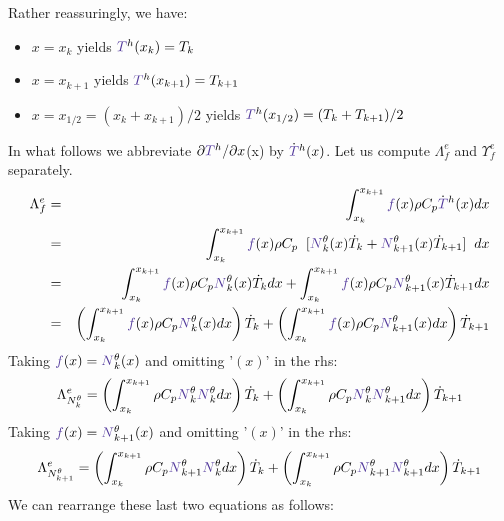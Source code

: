 Rather reassuringly, we have:
\begin{itemize}
\item $x=x_k$ yields ${\color{Violet}T}^h(x_k)=T_k$
\item $x=x_{k+1}$ yields ${\color{Violet}T}^h(x_{k+1})=T_{k+1}$
\item $x=x_{1/2}=(x_k+x_{k+1})/2$ yields ${\color{Violet}T}^h(x_{1/2})=(T_k+T_{k+1})/2$
\end{itemize}
In what follows we abbreviate $\partial {\color{Violet}T}^h/\partial x$(x) by $\dot{\color{Violet}T}^h(x)$.
Let us compute ${\Lambda}_f^e$ and ${\Upsilon}_f^e$ separately.
\begin{eqnarray}
{\Lambda}_f^e 
&=&\int_{x_k}^{x_{k+1}} {\color{Violet}f}(x) \rho C_p \dot {\color{Violet}T}^h(x) dx \nn\\
&=& \int_{x_k}^{x_{k+1}} {\color{Violet}f}(x) \rho C_p \;\;  [ {\color{Violet}N}_{k}^\theta(x) \dot{T}_k 
+ {\color{Violet}N}_{k+1}^\theta(x) \dot{T}_{k+1} ] \;\; dx  \nn\\
&=& \int_{x_k}^{x_{k+1}} {\color{Violet}f}(x) \rho C_p {\color{Violet}N}_{k}^\theta(x) \dot{T}_k  dx  
+ \int_{x_k}^{x_{k+1}} {\color{Violet}f}(x) \rho C_p {\color{Violet}N}_{k+1}^\theta(x) \dot{T}_{k+1}   dx \nn\\
&=&  \left( \int_{x_k}^{x_{k+1}} {\color{Violet}f}(x) \rho C_p  {\color{Violet}N}_{k}^\theta(x) dx \right) \dot{T}_k  
+ \left( \int_{x_k}^{x_{k+1}} {\color{Violet}f}(x) \rho C_p {\color{Violet}N}_{k+1}^\theta(x) dx \right)  \dot{T}_{k+1}  \nn
\end{eqnarray}
Taking ${\color{Violet}f}(x)={\color{Violet}N}_k^\theta(x)$ and omitting '$(x)$' in the rhs:
\[
{\Lambda}_{N_k^\theta}^e=
\left( \int_{x_k}^{x_{k+1}} \rho C_p  {\color{Violet}N}_k^\theta {\color{Violet}N}_{k}^\theta dx \right) \dot{T}_k  
+ \left( \int_{x_k}^{x_{k+1}} \rho C_p {\color{Violet}N}_k^\theta {\color{Violet}N}_{k+1}^\theta dx \right)  \dot{T}_{k+1} 
\]
Taking ${\color{Violet}f}(x)={\color{Violet}N}_{k+1}^\theta(x)$ and omitting '$(x)$' in the rhs:
\[
{\Lambda}_{N_{k+1}^\theta}^e
= \left( \int_{x_k}^{x_{k+1}} \rho C_p {\color{Violet}N}_{k+1}^\theta {\color{Violet}N}_{k}^\theta dx \right) \dot{T}_k  
+ \left( \int_{x_k}^{x_{k+1}} \rho C_p {\color{Violet}N}_{k+1}^\theta {\color{Violet}N}_{k+1}^\theta dx \right)  \dot{T}_{k+1} 
\]
We can rearrange these last two equations as follows:
